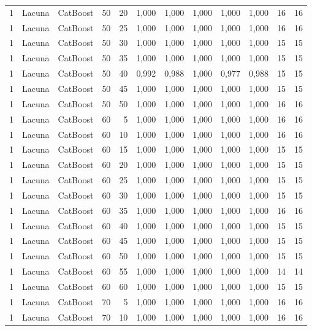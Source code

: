 \begin{longtable}{@{}rllrrrrrrrrr@{}}
1 & Lacuna & CatBoost & 50 & 20 & 1,000 & 1,000 & 1,000 & 1,000 & 1,000 & 16 & 16 \\
1 & Lacuna & CatBoost & 50 & 25 & 1,000 & 1,000 & 1,000 & 1,000 & 1,000 & 16 & 16 \\
1 & Lacuna & CatBoost & 50 & 30 & 1,000 & 1,000 & 1,000 & 1,000 & 1,000 & 15 & 15 \\
1 & Lacuna & CatBoost & 50 & 35 & 1,000 & 1,000 & 1,000 & 1,000 & 1,000 & 15 & 15 \\
1 & Lacuna & CatBoost & 50 & 40 & 0,992 & 0,988 & 1,000 & 0,977 & 0,988 & 15 & 15 \\
1 & Lacuna & CatBoost & 50 & 45 & 1,000 & 1,000 & 1,000 & 1,000 & 1,000 & 15 & 15 \\
1 & Lacuna & CatBoost & 50 & 50 & 1,000 & 1,000 & 1,000 & 1,000 & 1,000 & 16 & 16 \\
1 & Lacuna & CatBoost & 60 & 5 & 1,000 & 1,000 & 1,000 & 1,000 & 1,000 & 16 & 16 \\
1 & Lacuna & CatBoost & 60 & 10 & 1,000 & 1,000 & 1,000 & 1,000 & 1,000 & 16 & 16 \\
1 & Lacuna & CatBoost & 60 & 15 & 1,000 & 1,000 & 1,000 & 1,000 & 1,000 & 15 & 15 \\
1 & Lacuna & CatBoost & 60 & 20 & 1,000 & 1,000 & 1,000 & 1,000 & 1,000 & 15 & 15 \\
1 & Lacuna & CatBoost & 60 & 25 & 1,000 & 1,000 & 1,000 & 1,000 & 1,000 & 15 & 15 \\
1 & Lacuna & CatBoost & 60 & 30 & 1,000 & 1,000 & 1,000 & 1,000 & 1,000 & 15 & 15 \\
1 & Lacuna & CatBoost & 60 & 35 & 1,000 & 1,000 & 1,000 & 1,000 & 1,000 & 16 & 16 \\
1 & Lacuna & CatBoost & 60 & 40 & 1,000 & 1,000 & 1,000 & 1,000 & 1,000 & 15 & 15 \\
1 & Lacuna & CatBoost & 60 & 45 & 1,000 & 1,000 & 1,000 & 1,000 & 1,000 & 15 & 15 \\
1 & Lacuna & CatBoost & 60 & 50 & 1,000 & 1,000 & 1,000 & 1,000 & 1,000 & 15 & 15 \\
1 & Lacuna & CatBoost & 60 & 55 & 1,000 & 1,000 & 1,000 & 1,000 & 1,000 & 14 & 14 \\
1 & Lacuna & CatBoost & 60 & 60 & 1,000 & 1,000 & 1,000 & 1,000 & 1,000 & 15 & 15 \\
1 & Lacuna & CatBoost & 70 & 5 & 1,000 & 1,000 & 1,000 & 1,000 & 1,000 & 16 & 16 \\
1 & Lacuna & CatBoost & 70 & 10 & 1,000 & 1,000 & 1,000 & 1,000 & 1,000 & 16 & 16 \\

\end{longtable}
